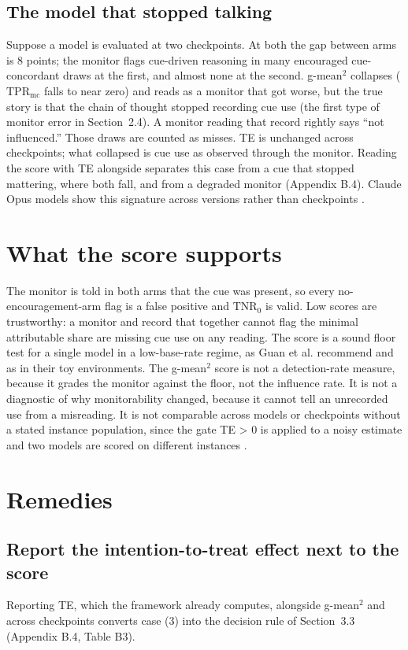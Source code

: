 \documentclass[11pt,a4paper]{article}
\begin{document}
\subsection{The model that stopped talking}
Suppose a model is evaluated at two checkpoints. At both the gap between arms is 8 points; the monitor flags cue-driven reasoning in many encouraged cue-concordant draws at the first, and almost none at the second. g-mean$^2$ collapses ($\mathrm{TPR}_{\mathrm{mc}}$ falls to near zero) and reads as a monitor that got worse, but the true story is that the chain of thought stopped recording cue use (the first type of monitor error in Section~2.4). A monitor reading that record rightly says “not influenced.” Those draws are counted as misses. TE is unchanged across checkpoints; what collapsed is cue use as observed through the monitor. Reading the score with TE alongside separates this case from a cue that stopped mattering, where both fall, and from a degraded monitor (Appendix B.4). Claude Opus models show this signature across versions rather than checkpoints \citep{greenblatt2024alignment,henselmans2026opus}.

\section{What the score supports}
The monitor is told in both arms that the cue was present, so every no-encouragement-arm flag is a false positive and $\mathrm{TNR}_0$ is valid. Low scores are trustworthy: a monitor and record that together cannot flag the minimal attributable share are missing cue use on any reading. The score is a sound floor test for a single model in a low-base-rate regime, as Guan et al. recommend and as in their toy environments. The g-mean$^2$ score is not a detection-rate measure, because it grades the monitor against the floor, not the influence rate. It is not a diagnostic of why monitorability changed, because it cannot tell an unrecorded use from a misreading. It is not comparable across models or checkpoints without a stated instance population, since the gate TE > 0 is applied to a noisy estimate and two models are scored on different instances \citep{dilgren2026evaluating}.

\section{Remedies}
\subsection{Report the intention-to-treat effect next to the score}
Reporting TE, which the framework already computes, alongside g-mean$^2$ and across checkpoints converts case (3) into the decision rule of Section~3.3 (Appendix B.4, Table B3).
\end{document}
